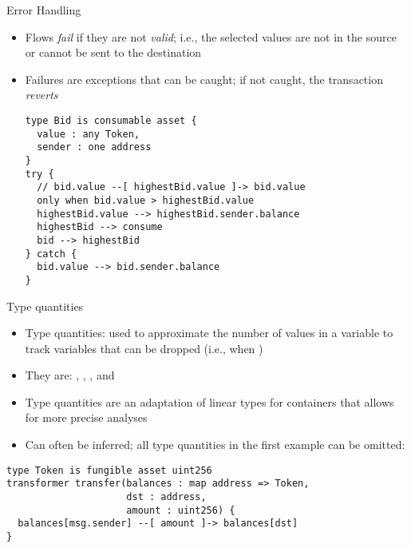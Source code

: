 \documentclass[leqno,presentation,usenames,dvipsnames]{beamer}
\begin{document}
\begin{frame}[fragile]{Error Handling}
    \begin{itemize}
        \item Flows \emph{fail} if they are not \emph{valid}; i.e., the selected values are not in the source or cannot be sent to the destination
        \item Failures are exceptions that can be caught; if not caught, the transaction \emph{reverts}
\begin{lstlisting}[language=flow, xleftmargin=-0.5em, basicstyle=\scriptsize\ttfamily]
type Bid is consumable asset {
  value : any Token,
  sender : one address
}
try {
  // bid.value --[ highestBid.value ]-> bid.value
  only when bid.value > highestBid.value
  highestBid.value --> highestBid.sender.balance
  highestBid --> consume
  bid --> highestBid
} catch {
  bid.value --> bid.sender.balance
}
\end{lstlisting}
    \end{itemize}
\end{frame}

\begin{frame}[fragile]{Type quantities}
    \begin{itemize}
        \item Type quantities: used to approximate the number of values in a variable to track  variables that can be dropped (i.e., when )
        \item They are: , , , and 
        \item Type quantities are an adaptation of linear types for containers that allows for more precise analyses
        \item Can often be inferred; all type quantities in the first example can be omitted:
    \end{itemize}

\begin{lstlisting}[language=flow, xleftmargin=-0.5em, basicstyle=\footnotesize\ttfamily]
type Token is fungible asset uint256
transformer transfer(balances : map address => Token,
                     dst : address,
                     amount : uint256) {
  balances[msg.sender] --[ amount ]-> balances[dst]
}
\end{lstlisting}
\end{frame}
\end{document}

